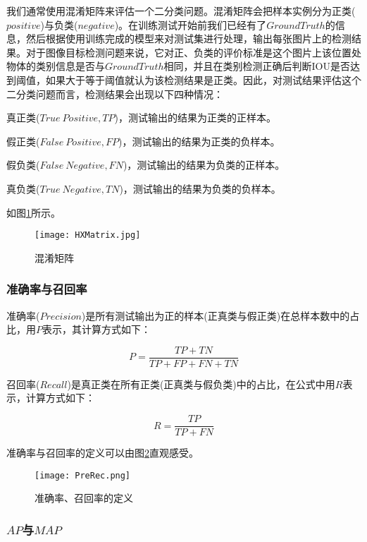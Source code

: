 我们通常使用混淆矩阵来评估一个二分类问题。混淆矩阵会把样本实例分为正类($positive$)与负类($negative$)。在训练测试开始前我们已经有了$Ground Truth$的信息，然后根据使用训练完成的模型来对测试集进行处理，输出每张图片上的检测结果。对于图像目标检测问题来说，它对正、负类的评价标准是这个图片上该位置处物体的类别信息是否与$Ground Truth$相同，并且在类别检测正确后判断IOU是否达到阈值，如果大于等于阈值就认为该检测结果是正类。因此，对测试结果评估这个二分类问题而言，检测结果会出现以下四种情况：

真正类($True \ Positive,TP$)，测试输出的结果为正类的正样本。

假正类($False \ Positive,FP$)，测试输出的结果为正类的负样本。

假负类($False \ Negative,FN$)，测试输出的结果为负类的正样本。

真负类($True \ Negative,TN$)，测试输出的结果为负类的负样本。

如图\ref{HXMatrix}所示。

\begin{figure}
	\center
	{\texttt{[image: HXMatrix.jpg]}}
	\caption{混淆矩阵}
	\label{HXMatrix}
\end{figure}

\subsubsection{准确率与召回率}

准确率($Precision$)是所有测试输出为正的样本(正真类与假正类)在总样本数中的占比，用$P$表示，其计算方式如下：

\begin{equation}
	P=\frac{TP+TN}{TP+FP+FN+TN}
\end{equation}


召回率($Recall$)是真正类在所有正类(正真类与假负类)中的占比，在公式中用$R$表示，计算方式如下：

\begin{equation}
R=\frac{TP}{TP+FN}
\end{equation}

准确率与召回率的定义可以由图\ref{PreRec}直观感受。

\begin{figure}
	\center
	{\texttt{[image: PreRec.png]}}
	\caption{准确率、召回率的定义}
	\label{PreRec}
\end{figure}

\subsubsection{$AP$与$MAP$}

